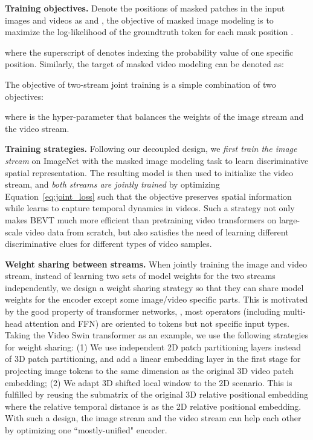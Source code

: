 \documentclass[10pt,twocolumn,letterpaper]{article}
\makeatletter
\newcommand*{\system}{BEVT\@\xspace}
\makeatother
\begin{document}
\vspace{0.05in}
\noindent\textbf{Training objectives.}  Denote the positions of masked patches in the input images and videos as  and , the objective of masked image modeling is to maximize the log-likelihood of the groundtruth token  for each mask position .



where the superscript of  denotes indexing the probability value of one specific position.  Similarly, the target of masked video modeling can be denoted as:


The objective of two-stream joint training is a simple combination of two objectives:

where  is the hyper-parameter that balances the weights of the image stream and the video stream.

\vspace{0.05in}
\noindent\textbf{Training strategies.}  Following our decoupled design, we \textit{first train the image stream} on ImageNet with the masked image modeling task to learn discriminative spatial representation. The resulting model is then used to initialize the video stream, and \textit{both streams are jointly trained} by optimizing Equation~\ref{eq:joint_loss} such that the objective  preserves spatial information while  learns to capture temporal dynamics in videos. Such a strategy not only makes \system much more efficient than pretraining video transformers on large-scale video data from scratch, but also satisfies the need of learning different discriminative clues for different types of video samples. 

\vspace{0.05in}
\noindent\textbf{Weight sharing between streams.} When jointly training the image and video stream, instead of learning two sets of model weights for the two streams independently, we design a weight sharing strategy so that they can share model weights for the encoder except some image/video specific parts. This is motivated by the good property of transformer networks, \ie, most operators (including multi-head attention and FFN) are oriented to tokens but not specific input types. Taking the Video Swin transformer as an example, we use the following strategies for weight sharing: (1) We use independent 2D patch partitioning layers instead of 3D patch partitioning, and add a linear embedding layer in the first stage for projecting image tokens to the same dimension as the original 3D video patch embedding; (2) We adapt 3D shifted local window to the 2D scenario. This is fulfilled by reusing the submatrix of the original 3D relative positional embedding where the relative temporal distance is  as the 2D relative positional embedding. With such a design, the image stream and the video stream can help each other by optimizing one ``mostly-unified" encoder.
\end{document}
